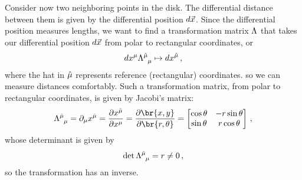  Consider now two neighboring points in the disk. The differential distance between them is given by the differential position $d\vec{x}$. Since the differential position measures lengths, we want to find a transformation matrix $\Lambda$ that takes our differential position $d\vec{x}$ from polar to rectangular coordinates, or
%
\begin{equation*}
  d\tvec\pos\mu\ttransmat{\ridx\mu}{\mu} \mapsto d\tvec\pos{\ridx\mu}\,,
\end{equation*}
%
where the hat in $\hat{\mu}$ represents reference (rectangular) coordinates. so we can measure distances comfortably.
%
Such a transformation matrix, from polar to rectangular coordinates, is given by Jacobi's matrix:
%
\begin{equation*}
  \ttransmat{\ridx\mu}\mu = \ipd\mu\tvec\pos{\ridx\mu}
                          = \dfrac{\partial\tvec\pos{\ridx\mu}}{\partial\tvec\pos\mu}
                          = \dfrac{\partial\br{\xpos,\ypos}}{\partial\br{\cxpos,\cypos}}
                          = \begin{bmatrix}
                              \cos\cypos & -\cxpos\sin\cypos \\
                              \sin\cypos &  \cxpos\cos\cypos
                            \end{bmatrix}\,,
\end{equation*}
%
whose determinant is given by
%
\begin{equation*}
  \det\ttransmat{\ridx\mu}\mu = \cxpos \neq 0 \,,
\end{equation*}
%
so the transformation has an inverse.

